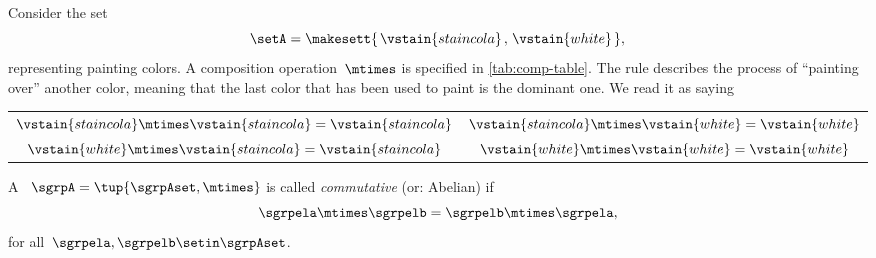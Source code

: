 \begin{example}
    Consider the set
    \begin{equation}
        \setA = \makesett{\hspace{0.05cm} \vstain{staincola}\hspace{0.05cm},\hspace{0.05cm} \vstain{white}\hspace{0.05cm}},
    \end{equation}
    representing painting colors.
    A composition operation~$\mtimes$ is specified in \cref{tab:comp-table}.
    The rule describes the process of ``painting over'' another color, meaning that the last color that has been used to paint is the dominant one.
    We read it as saying
    \begin{center}
        \setlength{\tabcolsep}{20pt}
        \begin{tabular}{cc}
            $\vstain{staincola} \mtimes \vstain{staincola} = \vstain{staincola}$ & $\vstain{staincola} \mtimes \vstain{white} = \vstain{white}$ \\
            $\vstain{white} \mtimes \vstain{staincola} = \vstain{staincola}$     & $\vstain{white} \mtimes \vstain{white} = \vstain{white}$
        \end{tabular}
    \end{center}
\end{example}

\begin{marginfigure}
    \centering
    \caption{The commutativity property}
    \label{fig:magma-diagram}
\end{marginfigure}


\begin{definition}
    \label{def:magma-commutativity}
    A ~$\sgrpA = \tup{\sgrpAset, \mtimes}$ is called \emph{commutative} (or: Abelian) if
    \begin{equation}
        \label{eq:semigroup-commutativity}
        \sgrpela \mtimes \sgrpelb = \sgrpelb \mtimes \sgrpela,
    \end{equation}
    for all~$\sgrpela, \sgrpelb \setin \sgrpAset$.
\end{definition}

